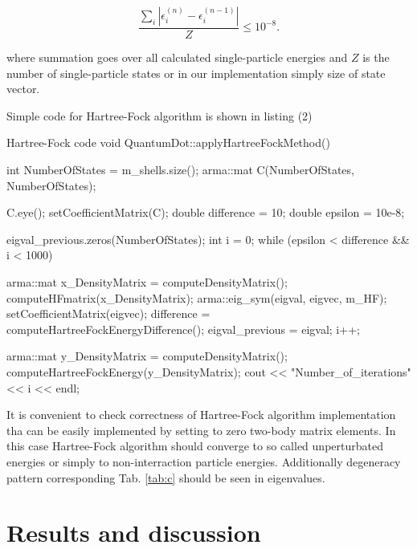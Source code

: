 \documentclass[10pt]{article}
\begin{document}
\begin{equation}
\frac{\sum_{i}|\epsilon_{i}^{(n)} - \epsilon_{i}^{(n-1)}|}{Z} \le 10^{-8}. \label{eq:diag-cond}
\end{equation}

where summation goes over all calculated single-particle energies and $Z$ is the number of single-particle states or in our implementation simply size of state vector.

Simple code for Hartree-Fock algorithm is shown in listing (2)
\begin{pseudolisting}{Hartree-Fock code}
void QuantumDot::applyHartreeFockMethod(){
    int NumberOfStates = m_shells.size();
    arma::mat C(NumberOfStates, NumberOfStates);

    C.eye();
    setCoefficientMatrix(C);
    double difference = 10;
    double epsilon = 10e-8;

    eigval_previous.zeros(NumberOfStates);
    int i = 0;
    while (epsilon < difference && i < 1000){
        arma::mat x_DensityMatrix = computeDensityMatrix();
        computeHFmatrix(x_DensityMatrix);
        arma::eig_sym(eigval, eigvec, m_HF);
        setCoefficientMatrix(eigvec);
        difference = computeHartreeFockEnergyDifference();
        eigval_previous = eigval;
        i++;

    }

    arma::mat y_DensityMatrix = computeDensityMatrix();
    computeHartreeFockEnergy(y_DensityMatrix);
    cout << "Number_of_iterations" << i << endl;
}
\end{pseudolisting}

It is convenient to check correctness of Hartree-Fock algorithm implementation tha can be easily implemented by setting to zero two-body matrix elements. In this case Hartree-Fock algorithm should converge to so called unperturbated energies or simply to non-interraction particle energies. Additionally degeneracy pattern corresponding Tab. \ref{tab:c} should be seen in eigenvalues.

\section{Results and discussion}\label{results}
\end{document}
